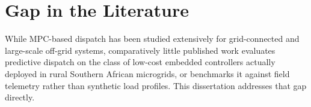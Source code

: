 \section{Gap in the Literature}
While MPC-based dispatch has been studied extensively for grid-connected and large-scale
off-grid systems, comparatively little published work evaluates predictive dispatch on the
class of low-cost embedded controllers actually deployed in rural Southern African microgrids,
or benchmarks it against field telemetry rather than synthetic load profiles. This
dissertation addresses that gap directly.

